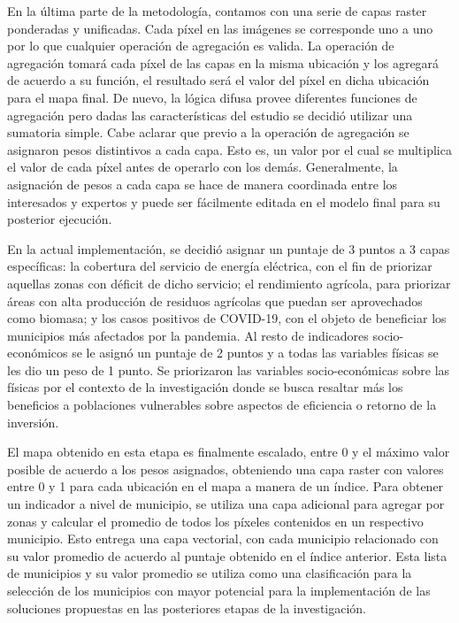 En la última parte de la metodología, contamos con una serie de capas raster ponderadas y unificadas.  Cada píxel en las imágenes se corresponde uno a uno por 
lo que cualquier operación de agregación es valida.  La operación de agregación tomará cada píxel de las capas en la misma ubicación y los agregará de acuerdo 
a su función, el resultado será el valor del píxel en dicha ubicación para el mapa final.  De nuevo, la lógica difusa provee diferentes funciones de 
agregación pero dadas las características del estudio se decidió utilizar una sumatoria simple.  Cabe aclarar que previo a la operación de agregación se 
asignaron pesos distintivos a cada capa.  Esto es, un valor por el cual se multiplica el valor de cada píxel antes de operarlo con los demás.  Generalmente, la 
asignación de pesos a cada capa se hace de manera coordinada entre los interesados y expertos y puede ser fácilmente editada en el modelo final para su 
posterior ejecución.  

En la actual implementación, se decidió asignar un puntaje de 3 puntos a 3 capas específicas: la cobertura del servicio de energía eléctrica, con el fin de 
priorizar aquellas zonas con déficit de dicho servicio; el rendimiento agrícola, para priorizar áreas con alta producción de residuos agrícolas que puedan ser 
aprovechados como biomasa; y los casos positivos de COVID-19, con el objeto de beneficiar los municipios más afectados por la pandemia.  Al resto de 
indicadores socio-económicos se le asignó un puntaje de 2 puntos y a todas las variables físicas se les dio un peso de 1 punto.  Se priorizaron las variables 
socio-económicas sobre las físicas por el contexto de la investigación donde se busca resaltar más los beneficios a poblaciones vulnerables sobre aspectos de
eficiencia o retorno de la inversión.

El mapa obtenido en esta etapa es finalmente escalado, entre 0 y el máximo valor posible de acuerdo a los pesos asignados, obteniendo una capa raster con 
valores entre 0 y 1 para cada ubicación en el mapa a manera de un índice.  Para obtener un indicador a nivel de municipio, se utiliza una capa adicional para 
agregar por zonas y calcular el promedio de todos los píxeles contenidos en un respectivo municipio.  Esto entrega una capa vectorial, con cada municipio 
relacionado con su valor promedio de acuerdo al puntaje obtenido en el índice anterior.  Esta lista de municipios y su valor promedio se utiliza como una 
clasificación para la selección de los municipios con mayor potencial para la implementación de las soluciones propuestas en las posteriores etapas de la 
investigación.
